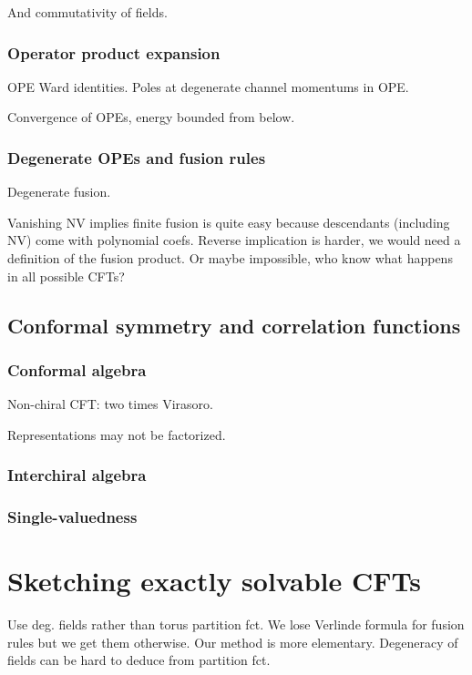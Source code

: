 \documentclass[12pt, a4paper]{article}
\theoremstyle{break}
\begin{document}
And commutativity of fields.

\subsubsection{Operator product expansion}\label{sec:ope}

OPE Ward identities. Poles at degenerate channel momentums in OPE. 

Convergence of OPEs, energy bounded from below.

\subsubsection{Degenerate OPEs and fusion rules}\label{sec:dope}

Degenerate fusion. 

Vanishing NV implies finite fusion is quite easy because descendants (including NV) come with polynomial coefs. Reverse implication is harder, we would need a definition of the fusion product. Or maybe impossible, who know what happens in all possible CFTs? 

\subsection{Conformal symmetry and correlation functions}

\subsubsection{Conformal algebra}

Non-chiral CFT: two times Virasoro.

Representations may not be factorized.

\subsubsection{Interchiral algebra}

\subsubsection{Single-valuedness}


\section{Sketching exactly solvable CFTs}

Use deg. fields rather than torus partition fct. We lose Verlinde formula for fusion rules but we get them otherwise. Our method is more elementary. Degeneracy of fields can be hard to deduce from partition fct. 
\end{document}
